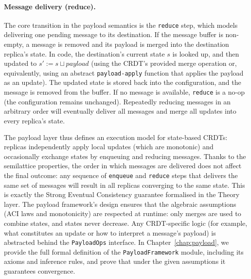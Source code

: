 \paragraph{Message delivery (reduce).}
The core transition in the payload semantics is the \texttt{reduce} step, which models delivering one pending message to its destination. If the message buffer is non-empty, a message is removed and its payload is merged into the destination replica’s state. In code, the destination’s current state $s$ is looked up, and then updated to $s' := s \sqcup \mathit{payload}$ (using the CRDT’s provided merge operation or, equivalently, using an abstract \texttt{payload-apply} function that applies the payload as an update). The updated state is stored back into the configuration, and the message is removed from the buffer. If no message is available, \texttt{reduce} is a no-op (the configuration remains unchanged). Repeatedly reducing messages in an arbitrary order will eventually deliver all messages and merge all updates into every replica’s state.

The payload layer thus defines an execution model for state-based CRDTs: replicas independently apply local updates (which are monotonic) and occasionally exchange states by enqueuing and reducing messages. Thanks to the semilattice properties, the order in which messages are delivered does not affect the final outcome: any sequence of \texttt{enqueue} and \texttt{reduce} steps that delivers the same set of messages will result in all replicas converging to the same state. This is exactly the Strong Eventual Consistency guarantee formalised in the Theory layer. The payload framework’s design ensures that the algebraic assumptions (ACI laws and monotonicity) are respected at runtime: only merges are used to combine states, and states never decrease. Any CRDT-specific logic (for example, what constitutes an update or how to interpret a message’s payload) is abstracted behind the \texttt{PayloadOps} interface. In Chapter~\ref{chap:payload}, we provide the full formal definition of the \texttt{PayloadFramework} module, including its axioms and inference rules, and prove that under the given assumptions it guarantees convergence.

